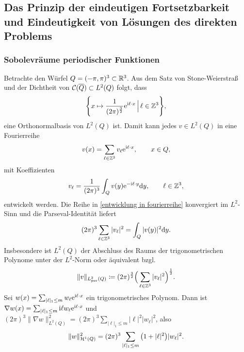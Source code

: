 \subsection{Das Prinzip der eindeutigen Fortsetzbarkeit und Eindeutigkeit von Lösungen des direkten Problems}
\renewcommand\thesection{\arabic{section}}
\renewcommand\thesubsection{\arabic{subsection}}
\setcounter{subsection}{6}
\setcounter{section}{6}
\setcounter{mydef}{0}
\setcounter{equation}{0}

\subsubsection*{Sobolevräume periodischer Funktionen}
Betrachte den Würfel \(Q=(-\pi,\pi)^3\subset\mathbb{R}^3\). Aus dem Satz von Stone-Weierstraß und der Dichtheit von \(\mathcal{C}(\overline{Q})\subset L^2(Q)\) folgt, dass 
\begin{equation*}
	\Bigg\{x\mapsto\frac{1}{(2\pi)^\frac{3}{2}}\mathrm{e}^{\mathrm{i}\ell\cdot x}\,\Big\lvert\,\ell\in\mathbb{Z}^3\Bigg\},
\end{equation*}
eine Orthonormalbasis von \(L^2(Q)\) ist. Damit kann jedes \(v\in L^2(Q)\) in eine Fourierreihe
\begin{equation}
	\label{entwicklung in fourierreihe}
	v(x)=\sum_{\ell\in\mathbb{Z}^3}v_\ell\mathrm{e}^{\mathrm{i}\ell\cdot x},\qquad x\in Q,
\end{equation}
mit Koeffizienten
\begin{equation}
	\label{entwicklung in fourierreihe: koeffizienten}
	v_\ell=\frac{1}{(2\pi)^3}\int_Qv(y)\mathrm{e}^{-\mathrm{i}\ell\cdot y}\mathrm{d}y,\qquad\ell\in\mathbb{Z}^3,
\end{equation}
entwickelt werden. Die Reihe in \eqref{entwicklung in fourierreihe} konvergiert im \(L^2\)-Sinn und die Parseval-Identität liefert
\begin{equation*}
	(2\pi)^3\sum_{\ell\in\mathbb{Z}^3}|v_\ell|^2=\int_Q|v(y)|^2\mathrm{d}y.
\end{equation*}
Insbesondere ist \(L^2(Q)\) der Abschluss des Raums der trigonometrischen Polynome unter der \(L^2\)-Norm oder äquivalent bzgl. 
\begin{equation*}
	\|v\|_{L_{\mathrm{per}}^2(Q)}\coloneqq(2\pi)^\frac{3}{2}\Big(\sum_{\ell\in\mathbb{Z}^3}|v_\ell|^2\Big)^\frac{1}{2}.
\end{equation*}
Sei \(w(x)=\sum_{|\ell|_1\leq m}w_\ell\mathrm{e}^{\mathrm{i}\ell\cdot x}\) ein trigonometrisches Polynom. Dann ist \(\nabla w(x)=\sum_{|\ell|_1\leq m}\mathrm{i}\ell w_\ell\mathrm{e}^{\mathrm{i}\ell\cdot x}\) und \((2\pi)^3\|\nabla w\|_{L^2(Q)}^2=(2\pi)^3\sum_{|\ell|_1\leq m}|\ell|^2|w_\ell|^2\), also
\begin{equation*}
	\|w\|_{\mathcal{H}^1(Q)}^2=(2\pi)^3\sum_{|\ell|_1\leq m}\big(1+|\ell|^2\big)|w_\ell|^2.
\end{equation*}
